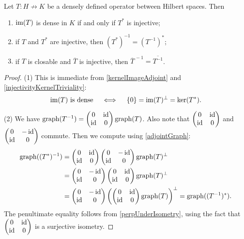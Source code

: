 \begin{proposition}
Let $T: H\not\to K$ be a densely defined operator between Hilbert spaces. Then
\begin{enumerate}
\item $\operatorname{im}(T)$ is dense in $K$ \textup{if and only if} $T^*$ is injective;
\item if $T$ and $T^*$ are injective, then $(T^*)^{-1} = (T^{-1})^*$;
\item if $T$ is closable and $\overline{T}$ is injective, then $\overline{T}^{\,-1} = \overline{T^{-1}}$.
\end{enumerate}
\begin{proof}
(1) This is immediate from \ref{kernelImageAdjoint} and \ref{injectivityKernelTriviality}:
\[ \text{$\operatorname{im}(T)$ is dense} \quad\iff\quad \{0\} = \operatorname{im}(T)^\perp = \ker(T^*). \]

(2) We have $\operatorname{graph}(T^{-1}) = \begin{pmatrix}
0 & \operatorname{id} \\ \operatorname{id} & 0
\end{pmatrix}\operatorname{graph}(T)$. Also note that $\begin{pmatrix}
0 & \operatorname{id} \\ \operatorname{id} & 0
\end{pmatrix}$ and $\begin{pmatrix}
0 & -\operatorname{id} \\ \operatorname{id} & 0
\end{pmatrix}$ commute. Then we compute using \ref{adjointGraph}:
\begin{align*}
\operatorname{graph}((T^*)^{-1}) &= \begin{pmatrix}
0 & \operatorname{id} \\ \operatorname{id} & 0
\end{pmatrix}\begin{pmatrix}
0 & -\operatorname{id} \\ \operatorname{id} & 0
\end{pmatrix}\operatorname{graph}(T)^\perp \\
&= \begin{pmatrix}
0 & -\operatorname{id} \\ \operatorname{id} & 0
\end{pmatrix}\begin{pmatrix}
0 & \operatorname{id} \\ \operatorname{id} & 0
\end{pmatrix}\operatorname{graph}(T)^\perp \\
&= \begin{pmatrix}
0 & -\operatorname{id} \\ \operatorname{id} & 0
\end{pmatrix}\left(\begin{pmatrix}
0 & \operatorname{id} \\ \operatorname{id} & 0
\end{pmatrix}\operatorname{graph}(T)\right)^\perp = \operatorname{graph}((T^{-1})^*).
\end{align*}
The penultimate equality follows from \ref{perpUnderIsometry}, using the fact that $\begin{pmatrix}
0 & \operatorname{id} \\ \operatorname{id} & 0
\end{pmatrix}$ is a surjective isometry.
\end{proof}

\end{proposition}

